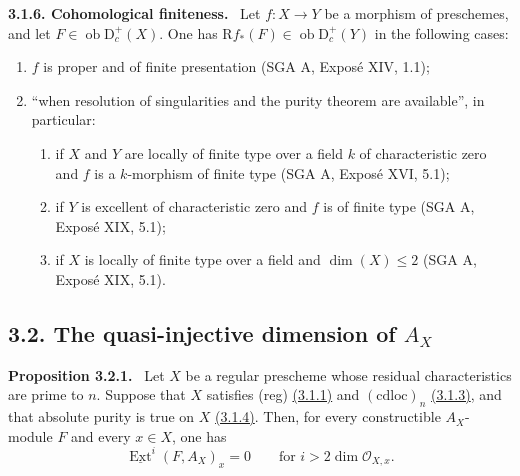 \documentclass[11pt]{article}
\providecommand{\cO}{\mathcal{O}}
\providecommand{\uExt}{\underline{\Ext}}
\newenvironment{statement}[1]{\par\medskip\noindent\textbf{#1.}\ }{\par\medskip}
\DeclareMathOperator{\Ext}{Ext}
\newcommand{\R}{\mathrm{R}}
\newcommand{\D}{\mathrm{D}}
\newcommand{\ob}{\operatorname{ob}}
\providecommand{\ob}{\operatorname{ob}}
\providecommand{\R}{\mathrm R}
\begin{document}
\label{sga5:I:statement:3.1.6}\begin{statement}{3.1.6. Cohomological finiteness}
Let $f:X\to Y$ be a morphism of preschemes, and let $F\in\ob\D_c^+(X)$. One has $\R f_*(F)\in\ob\D_c^+(Y)$ in the following cases:
\begin{enumerate}[label=\alph*)]
\item $f$ is proper and of finite presentation (SGA A, Exposé XIV, 1.1);
\item ``when resolution of singularities and the purity theorem are available'', in particular:
\begin{enumerate}[label=(\roman*)]
\item if $X$ and $Y$ are locally of finite type over a field $k$ of characteristic zero and $f$ is a $k$-morphism of finite type (SGA A, Exposé XVI, 5.1);
\item if $Y$ is excellent of characteristic zero and $f$ is of finite type (SGA A, Exposé XIX, 5.1);
\item if $X$ is locally of finite type over a field and $\dim(X)\le2$ (SGA A, Exposé XIX, 5.1).
\end{enumerate}
\end{enumerate}
\end{statement}

\subsection*{3.2. The quasi-injective dimension of $A_X$}\label{sga5:I:subsection:3.2}

\label{sga5:I:proposition:3.2.1}\begin{statement}{Proposition 3.2.1}
Let $X$ be a regular prescheme whose residual characteristics are prime to $n$. Suppose that $X$ satisfies (reg) \hyperref[sga5:I:statement:3.1.1]{(3.1.1)} and $(\mathrm{cdloc})_n$ \hyperref[sga5:I:statement:3.1.3]{(3.1.3)}, and that absolute purity is true on $X$ \hyperref[sga5:I:statement:3.1.4]{(3.1.4)}. Then, for every constructible $A_X$-module $F$ and every $x\in X$, one has
\begin{equation}
\uExt^i(F,A_X)_x=0\qquad\text{for } i>2\dim\cO_{X,x}.\tag{*}\label{sga5:I:equation:unnumbered:5}
\end{equation}
\end{statement}
\end{document}

